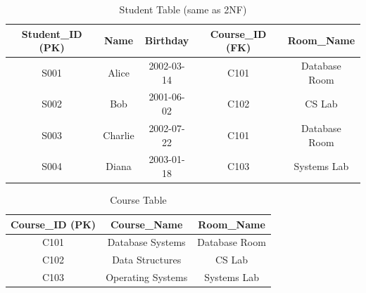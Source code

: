 \begin{table}[h!]
\centering
\caption{Student Table (same as 2NF)}
\label{tab:order_before_3nf}
\begin{tabular}{|c|c|c|c|c|}
\hline
\textbf{Student\_ID (PK)} & \textbf{Name} & \textbf{Birthday} & \textbf{Course\_ID (FK)} & \textbf{Room\_Name} \\
\hline
S001 & Alice & 2002-03-14 & C101 & Database Room \\
S002 & Bob & 2001-06-02 & C102 & CS Lab \\
S003 & Charlie & 2002-07-22 & C101 & Database Room \\
S004 & Diana & 2003-01-18 & C103 & Systems Lab \\
\hline
\end{tabular}
\end{table}

\vspace{1em}

\begin{table}[h!]
\centering
\caption{Course Table}
\begin{tabular}{|c|c|c|}
\hline
\textbf{Course\_ID (PK)} & \textbf{Course\_Name} & \textbf{Room\_Name} \\
\hline
C101 & Database Systems & Database Room \\
C102 & Data Structures & CS Lab \\
C103 & Operating Systems & Systems Lab \\
\hline
\end{tabular}
\end{table}

\vspace{1em}

